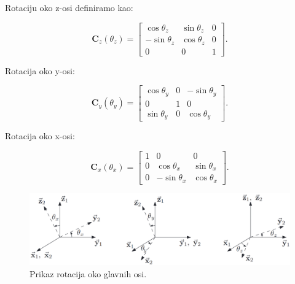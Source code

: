 \documentclass[times, utf8, diplomski, numeric]{templates/template}
\begin{document}
{{{{                Rotaciju oko z-osi definiramo kao:

                \begin{equation}
                \label{eq:principal_rot_z}
                \boldsymbol{C}_{z}(\theta_{z}) = 
                \begin{bmatrix}
                    \cos\theta_{z}   & \sin\theta_{z}    &  0 \\
                    -\sin\theta_{z}  & \cos\theta_{z}    &  0 \\
                    0                & 0                 &  1
                \end{bmatrix}
                .
                \end{equation}

                Rotacija oko y-osi:

                \begin{equation}
                \label{eq:principal_rot_y}
                \boldsymbol{C}_{y}(\theta_{y}) = 
                \begin{bmatrix}
                    \cos\theta_{y}   &    0    &  -\sin\theta_{y} \\
                    0                &    1    &  0               \\
                    \sin\theta_{y}   &    0    &  \cos\theta_{y}
                \end{bmatrix}
                .
                \end{equation}

                Rotacija oko x-osi:

                \begin{equation}
                \label{eq:principal_rot_x}
                \boldsymbol{C}_{x}(\theta_{x}) = 
                \begin{bmatrix}
                    1    &      0           &  0 \\
                    0    & \cos\theta_{x}   &  \sin\theta_{x} \\
                    0    & -\sin\theta_{x}  &  \cos\theta_{x}
                \end{bmatrix}
                .
                \end{equation}

                \begin{figure}[htb]
                \centering
                \includegraphics[width=1.0\textwidth]{images/principal_rotations.png}
                \caption{Prikaz rotacija oko glavnih osi.}
                \label{fig:principal_rotations}
                \end{figure}
            }

}}}
\end{document}
